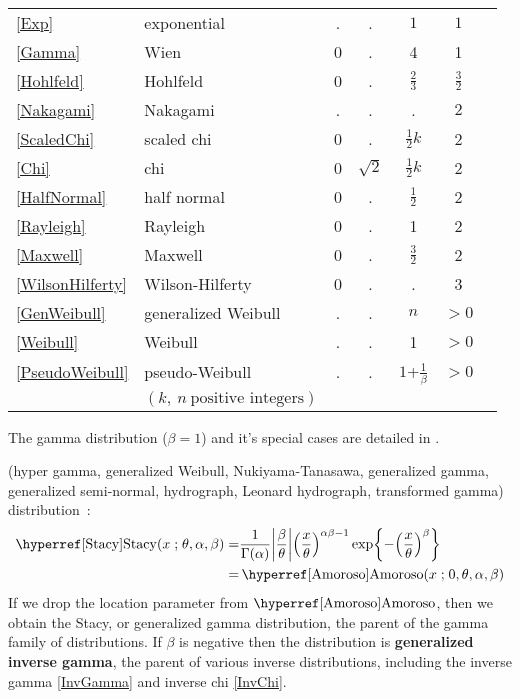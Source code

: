 \begin{table*}[p]
\begin{center}
{\begin{tabular}{llccccl}
\eqref{Exp} & exponential & . & . & $1$ & $1$ \\
\eqref{Gamma} & Wien & 0 & . & 4& 1 \\
\eqref{Hohlfeld} & Hohlfeld & 0 & . & $\tfrac{2}{3}$ & $\tfrac{3}{2}$ \\
\eqref{Nakagami} & Nakagami & . & . & . & $2$ \\
\eqref{ScaledChi} &scaled chi& 0 & . & $\tfrac{1}{2}k$  & 2  \\
\eqref{Chi} & chi & 0 & $\sqrt{2}$ & $\tfrac{1}{2}k$ & 2 \\
\eqref{HalfNormal} & half normal & 0 & . & $\tfrac{1}{2}$ & 2 & \\  
\eqref{Rayleigh} & Rayleigh & 0 & . & 1 & 2  \\
\eqref{Maxwell} & Maxwell& 0 & . & $\frac{3}{2}$  & 2  \\
\eqref{WilsonHilferty} &Wilson-Hilferty& 0 & . & .  & 3  \\
\eqref{GenWeibull} & generalized Weibull  & . & . & $n$ & $>\!\!0$  \\
\eqref{Weibull} & Weibull & . & . & 1 &  $>\!\!0$  \\
\eqref{PseudoWeibull} & pseudo-Weibull & . & . & $1$+$\tfrac{1}{\beta}$ &  $>\!\!0$  \\
& $(k,\ n\ \text{positive integers})$
\end{tabular} 
}
\end{center}
\end{table*}




The gamma distribution ($\beta=1$) and it's special cases are detailed in .

 (hyper gamma, generalized Weibull, Nukiyama-Tanasawa, generalized gamma, generalized semi-normal, hydrograph, Leonard hydrograph, transformed gamma)  distribution~\cite{Stacy1962,Dadpay2007}:
\begin{align}
\label{Stacy}
\opr{Stacy}(x \given \theta, \alpha, \beta) 
=& \frac{1}{\Gamma(\alpha)} \Left|\frac{\beta}{\theta}\Right| \Left(\frac{x}{\theta}\Right)^{\alpha\beta-1} 
\exp \Left\{ -\Left(\frac{x}{\theta}\Right)^{\beta} \Right\} \checked
\\=&  \opr{Amoroso}(x\given  0, \theta, \alpha, \beta) \notag \checked
\end{align}
If we drop the location parameter from $\opr{Amoroso}$, then we obtain the 
Stacy, or generalized gamma distribution, the parent of the gamma family of distributions.
If $\beta$ is negative then the distribution is  {\bf generalized inverse gamma}, the parent of various inverse distributions, including the inverse gamma \eqref{InvGamma} and inverse chi \eqref{InvChi}. 

